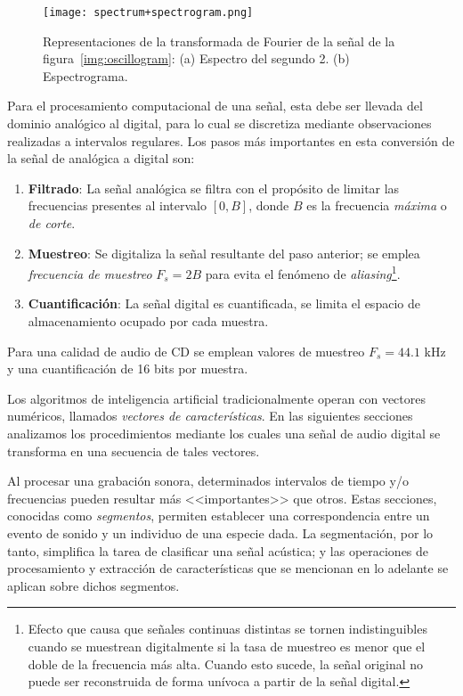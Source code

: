 \begin{figure}[!h]
    \centering
    \texttt{[image: spectrum+spectrogram.png]}
    \caption{Representaciones de la transformada de Fourier de la señal de la figura~\ref{img:oscillogram}: (a) Espectro del segundo 2. (b) Espectrograma.}
    \label{img:spectrum+spectrogram}
\end{figure}

Para el procesamiento computacional de una señal, esta debe ser llevada del dominio analógico al digital, para lo cual se discretiza mediante observaciones realizadas a intervalos regulares.
Los pasos más importantes en esta conversión de la señal de analógica a digital son:

\begin{enumerate}
    \item \textbf{Filtrado}: La señal analógica se filtra con el propósito de limitar las frecuencias presentes al intervalo $[0,B]$, donde $B$ es la frecuencia \textit{máxima} o \textit{de corte}.
    \item \textbf{Muestreo}: Se digitaliza la señal resultante del paso anterior;
    se emplea \textit{frecuencia de muestreo} $F_s = 2B$ para evita el fenómeno de \textit{aliasing}\footnote{Efecto que causa que señales continuas distintas se tornen indistinguibles cuando se muestrean digitalmente si la tasa de muestreo es menor que el doble de la frecuencia más alta.
    Cuando esto sucede, la señal original no puede ser reconstruida de forma unívoca a partir de la señal digital.}.
    \item \textbf{Cuantificación}: La señal digital es cuantificada, se limita el espacio de almacenamiento ocupado por cada muestra.
\end{enumerate}

Para una calidad de audio de CD se emplean valores de muestreo $F_s = 44.1$ kHz y una cuantificación de 16 bits por muestra.

Los algoritmos de inteligencia artificial tradicionalmente operan con vectores numéricos, llamados \textit{vectores de características}.
En las siguientes secciones analizamos los procedimientos mediante los cuales una señal de audio digital se transforma en una secuencia de tales vectores.

Al procesar una grabación sonora, determinados intervalos de tiempo y/o frecuencias pueden resultar más <<importantes>> que otros.
Estas secciones, conocidas como \textit{segmentos}, permiten establecer una correspondencia entre un evento de sonido y un individuo de una especie dada.
La segmentación, por lo tanto, simplifica la tarea de clasificar una señal acústica;
y las operaciones de procesamiento y extracción de características que se mencionan en lo adelante se aplican sobre dichos segmentos.

